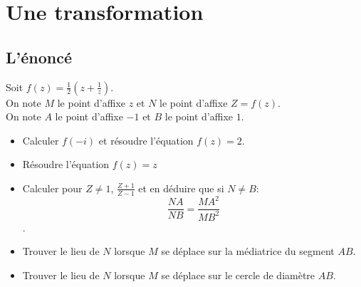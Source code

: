 \documentclass[a4paper,11pt]{book}
\begin{document}
\section{Une transformation} 
\subsection{L'\'enonc\'e}
Soit $\displaystyle f(z)=\frac{1}{2}(z+\frac{1}{z})$.\\
On note $M$ le point d'affixe $z$ et $N$ le point d'affixe $Z=f(z)$.\\
On note $A$ le point d'affixe $-1$ et $B$ le point d'affixe $1$.
\begin{itemize}
\item Calculer $f(-i)$ et r\'esoudre l'\'equation $f(z)=2$.
\item R\'esoudre l'\'equation $f(z)=z$
\item Calculer pour $Z \neq 1$, $\displaystyle \frac{Z+1}{Z-1}$ et en d\'eduire
que si $N\neq B$:
$$\frac{NA}{NB}=\frac{MA^2}{MB^2}$$.
\item Trouver le lieu de $N$ lorsque $M$ se d\'eplace sur la m\'ediatrice du 
segment $AB$.
\item Trouver le lieu de $N$ lorsque $M$ se d\'eplace sur le cercle de 
diam\`etre $AB$.
\end{itemize}
\end{document}
